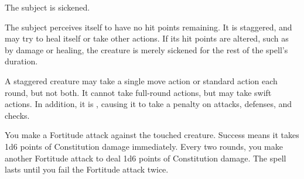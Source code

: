 \spelldur{\durshort}
\begin{spellhealthy}
    The subject is sickened.
\end{spellhealthy}
\begin{spellblood}
    The subject perceives itself to have no hit points remaining. It is staggered, and may try to heal itself or take other actions. If its hit points are altered, such as by damage or healing, the creature is merely sickened for the rest of the spell's duration.
\end{spellblood}
\begin{spellnotes}
    A staggered creature may take a single move action or standard action each round, but not both. It cannot take full-round actions, but may take swift actions. In addition, it is \vulnerable, causing it to take a  penalty on attacks, defenses, and checks.
\end{spellnotes}

\begin{spelleffect}
    You make a Fortitude attack against the touched creature. Success means it takes 1d6 points of Constitution damage immediately. Every two rounds, you make another Fortitude attack to deal 1d6 points of Constitution damage. The spell lasts until you fail the Fortitude attack twice.
\end{spelleffect}

